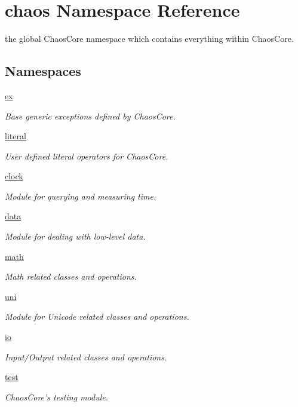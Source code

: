 \hypertarget{namespacechaos}{\section{chaos Namespace Reference}
\label{namespacechaos}
}


the global Chaos\-Core namespace which contains everything within Chaos\-Core.  


\subsection*{Namespaces}
\begin{DoxyCompactItemize}
\item 
\hyperlink{namespacechaos_1_1ex}{ex}
\begin{DoxyCompactList}\small\item\em Base generic exceptions defined by Chaos\-Core. \end{DoxyCompactList}\item 
\hyperlink{namespacechaos_1_1literal}{literal}
\begin{DoxyCompactList}\small\item\em User defined literal operators for Chaos\-Core. \end{DoxyCompactList}\item 
\hyperlink{namespacechaos_1_1clock}{clock}
\begin{DoxyCompactList}\small\item\em Module for querying and measuring time. \end{DoxyCompactList}\item 
\hyperlink{namespacechaos_1_1data}{data}
\begin{DoxyCompactList}\small\item\em Module for dealing with low-\/level data. \end{DoxyCompactList}\item 
\hyperlink{namespacechaos_1_1math}{math}
\begin{DoxyCompactList}\small\item\em Math related classes and operations. \end{DoxyCompactList}\item 
\hyperlink{namespacechaos_1_1uni}{uni}
\begin{DoxyCompactList}\small\item\em Module for Unicode related classes and operations. \end{DoxyCompactList}\item 
\hyperlink{namespacechaos_1_1io}{io}
\begin{DoxyCompactList}\small\item\em Input/\-Output related classes and operations. \end{DoxyCompactList}\item 
\hyperlink{namespacechaos_1_1test}{test}
\begin{DoxyCompactList}\small\item\em Chaos\-Core's testing module. \end{DoxyCompactList}\end{DoxyCompactItemize}
